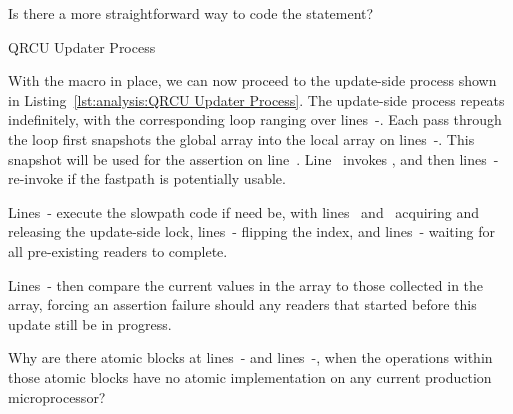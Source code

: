 \QuickQuiz{}
	Is there a more straightforward way to code the  statement?
 \QuickQuizEnd

\begin{listing}[htbp]

\caption{QRCU Updater Process}
\label{lst:analysis:QRCU Updater Process}
\end{listing}

\begin{lineref}
With the  macro in place, we can now proceed
to the update-side process shown in
Listing~\ref{lst:analysis:QRCU Updater Process}.
The update-side process repeats indefinitely, with the corresponding
 loop ranging over lines~-.
Each pass through the loop first snapshots the global 
array into the local  array on
lines~-.
This snapshot will be used for the assertion on line~.
Line~ invokes , and then
lines~-
re-invoke  if the fastpath is potentially
usable.

Lines~- execute the slowpath code if need be, with
lines~ and~ acquiring and releasing the update-side lock,
lines~- flipping the index, and
lines~- waiting for
all pre-existing readers to complete.

Lines~- then compare the current values
in the 
array to those collected in the  array,
forcing an assertion failure should any readers that started before
this update still be in progress.
\end{lineref}

\QuickQuiz{}
	\begin{lineref}
	Why are there atomic blocks at lines~-
	and lines~-, when the operations
	within those atomic
	blocks have no atomic implementation on any current
	production microprocessor?
	\end{lineref}
 \QuickQuizEnd

